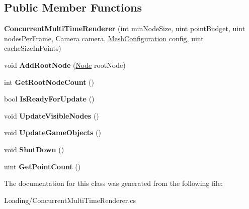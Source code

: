 \subsection*{Public Member Functions}
\begin{DoxyCompactItemize}
\item 
\mbox{\label{class_loading_1_1_concurrent_multi_time_renderer_ad368df666c756e4541af205b930640bf}} 
{\bfseries Concurrent\+Multi\+Time\+Renderer} (int min\+Node\+Size, uint point\+Budget, uint nodes\+Per\+Frame, Camera camera, \hyperlink{class_object_creation_1_1_mesh_configuration}{Mesh\+Configuration} config, uint cache\+Size\+In\+Points)
\item 
\mbox{\label{class_loading_1_1_concurrent_multi_time_renderer_a92ef20bfb5177d3e1afa9ee3327f3449}} 
void {\bfseries Add\+Root\+Node} (\hyperlink{class_cloud_data_1_1_node}{Node} root\+Node)
\item 
\mbox{\label{class_loading_1_1_concurrent_multi_time_renderer_adceaa06267aefc6cca72ff9f44f354d8}} 
int {\bfseries Get\+Root\+Node\+Count} ()
\item 
\mbox{\label{class_loading_1_1_concurrent_multi_time_renderer_a161bda4ed67d267fec6ba5ccce44d5b9}} 
bool {\bfseries Is\+Ready\+For\+Update} ()
\item 
\mbox{\label{class_loading_1_1_concurrent_multi_time_renderer_abe0bd3b605af54b60630d9a558dda7b2}} 
void {\bfseries Update\+Visible\+Nodes} ()
\item 
\mbox{\label{class_loading_1_1_concurrent_multi_time_renderer_a147eb4990903757e4fde6968f0ef50dc}} 
void {\bfseries Update\+Game\+Objects} ()
\item 
\mbox{\label{class_loading_1_1_concurrent_multi_time_renderer_a5d4c4db0c0d0fd7ae91a5129e89d12f3}} 
void {\bfseries Shut\+Down} ()
\item 
\mbox{\label{class_loading_1_1_concurrent_multi_time_renderer_a1f3e936364cb90d633aa1ca97f2e3981}} 
uint {\bfseries Get\+Point\+Count} ()
\end{DoxyCompactItemize}


The documentation for this class was generated from the following file\+:\begin{DoxyCompactItemize}
\item 
Loading/Concurrent\+Multi\+Time\+Renderer.\+cs\end{DoxyCompactItemize}
